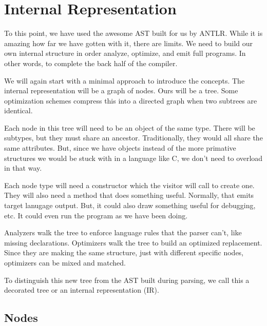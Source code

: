 \chapter{Internal Representation}

To this point, we have used the awesome AST built for us by ANTLR.
While it is amazing how far we have gotten with it, there are limits.
We need to build our own internal structure in order analyze, optimize,
and emit full programs. In other words, to complete the back half of the
compiler.

We will again start with a minimal approach to introduce the concepts.
The internal representation will be a graph of nodes. Ours will
be a tree. Some optimization schemes compress this into
a directed graph when two subtrees are identical.

Each node in this tree will need to be an object of the same type.
There will be subtypes, but they must share an ancestor.
Traditionally, they would all share the same attributes. But, since
we have objects instead of the more primative structures we would
be stuck with in a language like C, we don't need to overload in that way.

Each node type will need a constructor which the visitor will call to
create one. They will also need a method that does something useful.
Normally, that emits target lanugage output. But, it could also
draw something useful for debugging, etc. It could even run the
program as we have been doing.

Analyzers walk the tree to enforce language rules that the parser
can't, like missing declarations. Optimizers walk the tree to
build an optimized replacement. Since they are making the same
structure, just with different specific nodes, optimizers can
be mixed and matched.

To distinguish this new tree from the AST built during parsing,
we call this a decorated tree or an internal representation (IR).

\section{Nodes}

